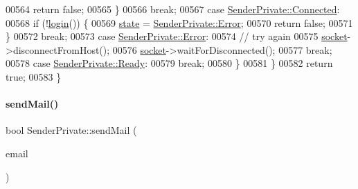 \begin{DoxyCode}
00564                 \textcolor{keywordflow}{return} \textcolor{keyword}{false};
00565             \}
00566             \textcolor{keywordflow}{break};
00567         \textcolor{keywordflow}{case} \hyperlink{class_simple_mail_1_1_sender_private_ae09befddf0fae8e8f2ea153ead2b8b0aa81776327acf2e160bb969693bdc4bc3b}{SenderPrivate::Connected}:
00568             \textcolor{keywordflow}{if} (!\hyperlink{class_simple_mail_1_1_sender_private_a927e5c262ee89fb335410ebec020091d}{login}()) \{
00569                 \hyperlink{class_simple_mail_1_1_sender_private_af73e80fdae8024d12714f6f3a1cc1e23}{state} = \hyperlink{class_simple_mail_1_1_sender_private_ae09befddf0fae8e8f2ea153ead2b8b0aa86a2d9c3162cdacedf7c8948d2d99fe4}{SenderPrivate::Error};
00570                 \textcolor{keywordflow}{return} \textcolor{keyword}{false};
00571             \}
00572             \textcolor{keywordflow}{break};
00573         \textcolor{keywordflow}{case} \hyperlink{class_simple_mail_1_1_sender_private_ae09befddf0fae8e8f2ea153ead2b8b0aa86a2d9c3162cdacedf7c8948d2d99fe4}{SenderPrivate::Error}:
00574             \textcolor{comment}{// try again}
00575             \hyperlink{class_simple_mail_1_1_sender_private_a223cab47555a39f45f30569328fa20bc}{socket}->disconnectFromHost();
00576             \hyperlink{class_simple_mail_1_1_sender_private_a223cab47555a39f45f30569328fa20bc}{socket}->waitForDisconnected();
00577             \textcolor{keywordflow}{break};
00578         \textcolor{keywordflow}{case} \hyperlink{class_simple_mail_1_1_sender_private_ae09befddf0fae8e8f2ea153ead2b8b0aac1f1f30c7c54375f9bed9a95bd082416}{SenderPrivate::Ready}:
00579             \textcolor{keywordflow}{break};
00580         \}
00581     \}
00582     \textcolor{keywordflow}{return} \textcolor{keyword}{true};
00583 \}
\end{DoxyCode}
\mbox{\label{class_simple_mail_1_1_sender_private_a2ede5284746e77ee37b8fe96f4bbb100}} 
\paragraph{\texorpdfstring{send\+Mail()}{sendMail()}}
{\footnotesize\ttfamily bool Sender\+Private\+::send\+Mail (\begin{DoxyParamCaption}\item[{\hyperlink{class_simple_mail_1_1_mime_message}{Mime\+Message} \&}]{email }\end{DoxyParamCaption})}



